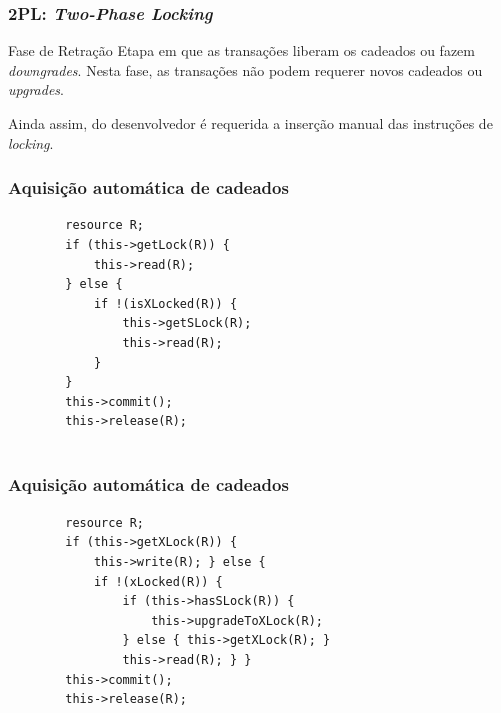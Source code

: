 \documentclass{beamer}
\begin{document}
\begin{frame}
    \frametitle{2PL: \emph{Two-Phase Locking}}
    
    \begin{block}{Fase de Retração}
        Etapa em que as transações liberam os cadeados ou fazem \emph{downgrades}. Nesta fase, as transações não podem requerer novos cadeados ou \emph{upgrades}.
    \end{block}

    \medskip
    Ainda assim, do desenvolvedor é requerida a inserção manual das instruções de \emph{locking}.
\end{frame}


\begin{frame}[fragile] %
    \frametitle{Aquisição automática de cadeados}
    \begin{example}
    \begin{verbatim}
        resource R;
        if (this->getLock(R)) {
            this->read(R);
        } else {
            if !(isXLocked(R)) {
                this->getSLock(R);
                this->read(R);
            }
        }
        this->commit();
        this->release(R);
    
    \end{verbatim}
    \end{example}
\end{frame}


\begin{frame}[fragile] %
    \frametitle{Aquisição automática de cadeados}

    \begin{example}
    \begin{verbatim}
        resource R;
        if (this->getXLock(R)) {
            this->write(R); } else {
            if !(xLocked(R)) {
                if (this->hasSLock(R)) {
                    this->upgradeToXLock(R);
                } else { this->getXLock(R); }
                this->read(R); } }
        this->commit();
        this->release(R);
    
    \end{verbatim}
    \end{example}
\end{frame}
\end{document}

